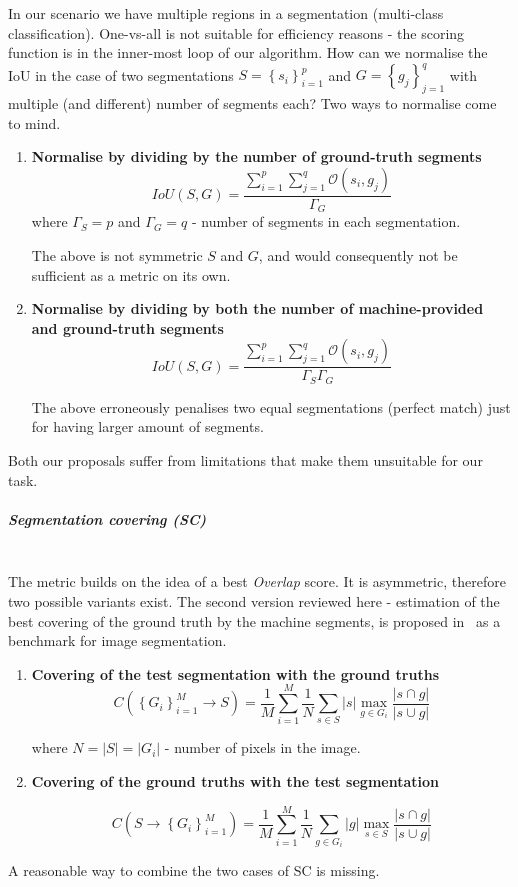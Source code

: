 In our scenario we have multiple regions in a segmentation (multi-class classification). One-vs-all is not suitable for efficiency reasons - the scoring function is in the inner-most loop of our algorithm. How can we normalise the IoU in the case of two segmentations $S=\left\{ {s_{i}}\right\} _{i=1}^{p}$
and $G=\left\{ {g_{j}}\right\} _{j=1}^{q}$ with multiple (and different) number of segments each? Two ways to normalise come to mind.

\begin{enumerate}
\item{\textbf{Normalise by dividing by the number of ground-truth segments}}
\[
IoU(S,G)=\frac{\sum\limits _{i=1}^{p}\sum\limits _{j=1}^{q}\mathcal{O}\left(s_{i},g_{j}\right)}{\Gamma_{G}}
\]
where $\Gamma_{S}=p$ and $\Gamma_{G}=q$ - number of segments in each segmentation.

The above is not symmetric \wrt $S$ and $G$, and would consequently not be sufficient as a metric on its own.

\item{\textbf{Normalise by dividing by both the number of machine-provided and ground-truth segments}}
\[
IoU(S,G)=\frac{\sum\limits _{i=1}^{p}\sum\limits _{j=1}^{q}\mathcal{O}\left(s_{i},g_{j}\right)}{\Gamma_{S}\Gamma_{G}}
\]

The above erroneously penalises two equal segmentations (perfect match) just for having larger amount of segments.
\end{enumerate}
Both our proposals suffer from limitations that make them unsuitable for our task.

\subparagraph{Segmentation covering (SC)}\mbox{}\\
The metric builds on the idea of a best \textit{Overlap} score. 
It is asymmetric, therefore two possible variants exist. The second version reviewed here - estimation of the best covering of the ground truth by the machine segments, is proposed in~\cite{Arbelaez09} as a benchmark for image segmentation.

\begin{enumerate}
\item{\textbf{Covering of the test segmentation with the ground truths}}
\[
C\left(\left\{ {G_{i}}\right\} _{i=1}^{M}\longrightarrow S\right)=\frac{1}{M}\sum\limits _{i=1}^{M}\frac{1}{N}\sum\limits _{s\in S}\left|s\right|\max_{g\in G_{i}}\frac{\left|s\cap g\right|}{\left|s\cup g\right|}
\]

where $N=\left|S\right|=\left|G_{i}\right|$ - number of pixels in the image.

\item{\textbf{Covering of the ground truths with the test segmentation}}

\[
C\left(S\longrightarrow\left\{ {G_{i}}\right\} _{i=1}^{M}\right)=\frac{1}{M}\sum\limits _{i=1}^{M}\frac{1}{N}\sum\limits _{g\in G_{i}}\left|g\right|\max_{s\in S}\frac{\left|s\cap g\right|}{\left|s\cup g\right|}
\]
\end{enumerate}
A reasonable %
way to combine the two cases of SC is missing.

